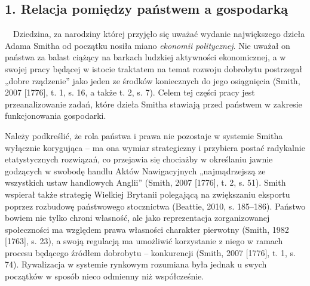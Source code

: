\documentclass[a4paper]{article}
\begin{document}
\subsection[1. Relacja pomiędzy państwem a gospodarką]{1. Relacja pomiędzy państwem a gospodarką}
\ \ Dziedzina, za narodziny której przyjęło się uważać wydanie największego dzieła Adama Smitha od początku nosiła miano \textit{ekonomii} \textit{politycznej}. Nie uważał on państwa za balast ciążący na barkach ludzkiej aktywności ekonomicznej, a w swojej pracy będącej w istocie traktatem na temat rozwoju dobrobytu postrzegał „dobre rządzenie” jako jeden ze środków koniecznych do jego osiągnięcia \label{ref:RNDnQbUYFullV}(Smith, 2007 [1776], t. 1, s. 16, a także t. 2, s. 7). Celem tej części pracy jest przeanalizowanie zadań, które dzieła Smitha stawiają przed państwem w zakresie funkcjonowania gospodarki.

 Należy podkreślić, że rola państwa i prawa nie pozostaje w systemie Smitha wyłącznie korygująca – ma ona wymiar strategiczny i przybiera postać radykalnie etatystycznych rozwiązań, co przejawia się chociażby w określaniu jawnie godzących w swobodę handlu Aktów Nawigacyjnych „najmądrzejszą ze wszystkich ustaw handlowych Anglii” \label{ref:RNDSfqMVn36ju}(Smith, 2007 [1776], t. 2, s. 51). Smith wspierał także strategię Wielkiej Brytanii polegającą na zwiększaniu eksportu poprzez rozbudowę państwowego stocznictwa \label{ref:RNDNSdWnZqXWk}(Beattie, 2010, s. 185–186). Państwo bowiem nie tylko chroni własność, ale jako reprezentacja zorganizowanej społeczności ma względem prawa własności charakter pierwotny \label{ref:RNDRS9jKbzBoD}(Smith, 1982 [1763], s. 23), a swoją regulacją ma umożliwić korzystanie z niego w ramach procesu będącego źródłem dobrobytu – konkurencji \label{ref:RND8sqtcJZ1ob}(Smith, 2007 [1776], t. 1, s. 74). Rywalizacja w systemie rynkowym rozumiana była jednak u swych początków w sposób nieco odmienny niż współcześnie.
\end{document}
